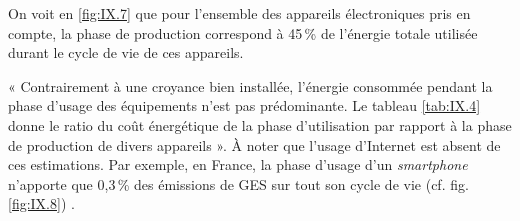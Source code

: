 
\vspace{6pt}

On voit en \cref{fig:IX.7} que pour l'ensemble des appareils électroniques pris en compte, la phase de production correspond à 45\,\% de l'énergie totale utilisée durant le cycle de vie de ces appareils.

« Contrairement à une croyance bien installée, l’énergie consommée pendant la phase d’usage des équipements n’est pas prédominante. Le tableau \ref{tab:IX.4} donne le ratio du coût énergétique de la phase d’utilisation par rapport à la phase de production de divers appareils ». À noter que l'usage d'Internet est absent de ces estimations. Par exemple, en France, la phase d'usage d'un \textit{smartphone} n'apporte que 0,3\,\% des émissions de GES sur tout son cycle de vie (cf. fig. \ref{fig:IX.8}) \parencite{Marquet-et-al:2019}. 

